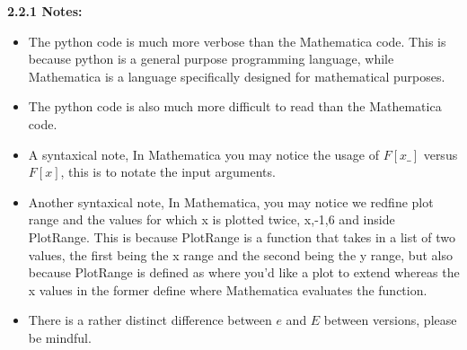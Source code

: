 \documentclass{article}
\begin{document}
    \textbf{2.2.1 Notes:} 
    \begin{itemize}
        \item The python code is much more verbose than the Mathematica code. This is because python is a general purpose programming language, while Mathematica is a language specifically designed for mathematical purposes.
        \item The python code is also much more difficult to read than the Mathematica code. 
        \item A syntaxical note, In Mathematica you may notice the usage of $F[x\_]$ versus $F[x]$, this is to notate the input arguments. 
        \item Another syntaxical note, In Mathematica, you may notice we redfine plot range and the values for which x is plotted twice, {x,-1,6} and inside PlotRange. 
        This is because PlotRange is a function that takes in a list of two values, the first being the x range and the second being the y range, but also because PlotRange is defined as where you'd like a plot to extend whereas the x values in the former define where Mathematica evaluates the function. 
        \item There is a rather distinct difference between $e$ and $E$ between versions, please be mindful.
    \end{itemize}

    \vfill
   \newpage
   \headheight=10pt
\end{document}
